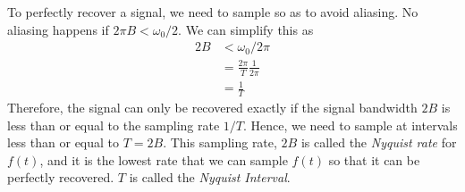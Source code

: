 \documentclass[10pt]{article}
\begin{document}
To perfectly recover a signal, we need to sample so as to avoid aliasing.  No aliasing happens if $2\pi B < \omega_0 / 2$.  We can simplify this as
\begin{align*}
    2B &< \omega_0 / 2\pi\\
    &= \frac{2\pi}{T} \frac{1}{2\pi}\\
    &= \frac{1}{T}
\end{align*}
Therefore, the signal can only be recovered exactly if the signal bandwidth $2B$ is less than or equal to the sampling rate $1/T$.  Hence, we need to sample at intervals less than or equal to $T = 2B$.  This sampling rate, $2B$ is called the \textit{Nyquist rate} for $f(t)$, and it is the lowest rate that we can sample $f(t)$ so that it can be perfectly recovered.  $T$ is called the \textit{Nyquist Interval}.
\end{document}
